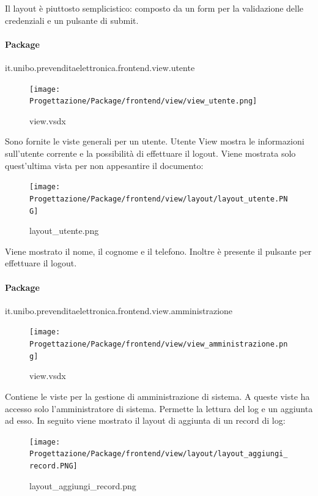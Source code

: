 \documentclass[a4paper]{article}
\begin{document}
Il layout è piuttosto semplicistico: composto da un form per la validazione delle credenziali e un pulsante di submit.

\newpage

\paragraph{Package} it.unibo.prevenditaelettronica.frontend.view.utente


\begin{figure}[H]
    \texttt{[image: Progettazione/Package/frontend/view/view\_utente.png]}
    \centering
    \caption{view.vsdx}
\end{figure}

Sono fornite le viste generali per un utente. Utente View mostra le informazioni sull'utente corrente e la possibilità di effettuare il logout. Viene mostrata solo quest'ultima vista per non appesantire il documento:

\begin{figure}[H]
    \texttt{[image: Progettazione/Package/frontend/view/layout/layout\_utente.PNG]}
    \centering
    \caption{layout\_utente.png}
\end{figure}

Viene mostrato il nome, il cognome e il telefono. Inoltre è presente il pulsante per effettuare il logout.

\newpage

\paragraph{Package} it.unibo.prevenditaelettronica.frontend.view.amministrazione


\begin{figure}[H]
    \texttt{[image: Progettazione/Package/frontend/view/view\_amministrazione.png]}
    \centering
    \caption{view.vsdx}
\end{figure}

Contiene le viste per la gestione di amministrazione di sistema. A queste viste ha accesso solo l'amministratore di sistema. Permette la lettura del log e un aggiunta ad esso. In seguito viene mostrato il layout di aggiunta di un record di log:

\begin{figure}[H]
    \texttt{[image: Progettazione/Package/frontend/view/layout/layout\_aggiungi\_record.PNG]}
    \centering
    \caption{layout\_aggiungi\_record.png}
\end{figure}
\end{document}
